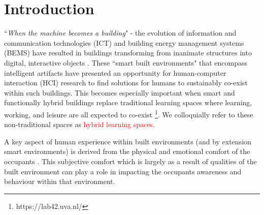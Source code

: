 \documentclass[acmconf, anonymous, review]{acmart}
\begin{document}



 
\maketitle

\section{Introduction}
``\textit{When the machine becomes a building}" - the evolution of information and communication technologies (ICT) and building energy management systems (BEMS) have resulted in buildings transforming from inanimate structures into digital, interactive objects \cite{nembrini2017human}. These ``smart built environments" that encompass intelligent artifacts have presented an opportunity for human-computer interaction (HCI) research to find solutions for humans to sustainably co-exist within such buildings. This becomes especially important when smart and functionally hybrid buildings replace traditional learning spaces where learning, working, and leisure are all expected to co-exist \footnote{https://lab42.uva.nl/}. We colloquially refer to these non-traditional spaces as \textcolor{red}{hybrid learning spaces}. 

A key aspect of human experience within built environments (and by extension smart environments) is derived from the physical and emotional comfort of the occupants \cite{alavi2017comfort}. This subjective comfort which is largely as a result of qualities of the built environment can play a role in impacting the occupants awareness and behaviour within that environment.  
\end{document}
